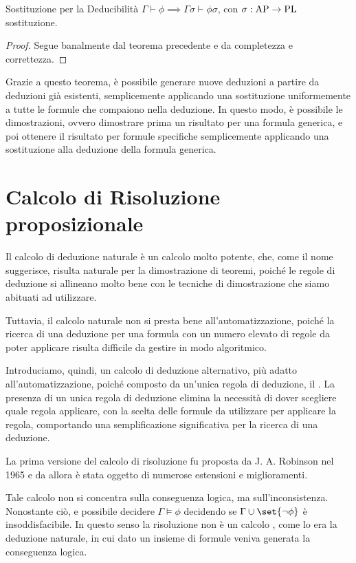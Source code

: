 \begin{corollary}{Sostituzione per la Deducibilità}
  \(\Gamma\vdash\phi\implies\Gamma\sigma\vdash\phi\sigma\), con \(\sigma:\AP \to \PL\) sostituzione.
\end{corollary}
\begin{proof}
  Segue banalmente dal teorema precedente e da completezza e correttezza.
\end{proof}

Grazie a questo teorema, è possibile generare nuove deduzioni a partire da deduzioni già esistenti, semplicemente applicando una sostituzione uniformemente a tutte le formule che compaiono nella deduzione. In questo modo, è possibile  le dimostrazioni, ovvero dimostrare prima un risultato per una formula generica, e poi ottenere il risultato per formule specifiche semplicemente applicando una sostituzione alla deduzione della formula generica.

\section{Calcolo di Risoluzione proposizionale}

Il calcolo di deduzione naturale è un calcolo molto potente, che, come il nome suggerisce, risulta naturale per la dimostrazione di teoremi, poiché le regole di deduzione si allineano molto bene con le tecniche di dimostrazione che siamo abituati ad utilizzare.

Tuttavia, il calcolo naturale non si presta bene all'automatizzazione, poiché la ricerca di una deduzione per una formula con un numero elevato di regole da poter applicare risulta difficile da gestire in modo algoritmico.

Introduciamo, quindi, un calcolo di deduzione alternativo, più adatto all'automatizzazione, poiché composto da un'unica regola di deduzione, il . La presenza di un unica regola di deduzione elimina la necessità di dover scegliere quale regola applicare,  con la scelta delle formule da utilizzare per applicare la regola, comportando una semplificazione significativa per la ricerca di una deduzione.

La prima versione del calcolo di risoluzione fu proposta da J. A. Robinson nel 1965 e da allora è stata oggetto di numerose estensioni e miglioramenti.

Tale calcolo non si concentra sulla conseguenza logica, ma sull'inconsistenza. 
Nonostante ciò, e possibile decidere \(\Gamma\models\phi\) decidendo se \(\Gamma\cup\set{\neg\phi}\) è insoddisfacibile.
In questo senso la risoluzione non è un calcolo , come lo era la deduzione naturale, in cui dato un insieme di formule veniva generata la conseguenza logica.

